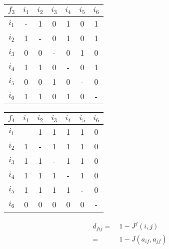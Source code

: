 \begin{table}[p]
\begin{center}
    \begin{tabular}{ | c | c | c | c | c | c | c | } 
    \hline
     $f_3$ & $i_1$ & $i_2$ & $i_3$ & $i_4$ & $i_5$ & $i_6$  \\ \hline
     $i_1$ & -  &  1  &  0  &  1  &  0  &  1 \\ \hline
     $i_2$ & 1  &  -  &  0  &  1  &  0  &  1  \\ \hline
     $i_3$ & 0  &  0  &  -  &  0  &  1  &  0 \\ \hline
     $i_4$ & 1  &  1  &  0  &  -  &  0  &  1 \\ \hline
     $i_5$ & 0  &  0  &  1  &  0  &  -  &  0 \\ \hline
     $i_6$ & 1  &  1  &  0  &  1  &  0  &  - \\ \hline
    \end{tabular}    
    \quad
    \begin{tabular}{ | c | c | c | c | c | c | c | } 
    \hline
     $f_4$ & $i_1$ & $i_2$ & $i_3$ & $i_4$ & $i_5$ & $i_6$  \\ \hline
     $i_1$ & -  &  1  &  1 &   1 &   1  &  0 \\ \hline
     $i_2$ & 1  &  -  &  1 &   1 &   1  &  0  \\ \hline
     $i_3$ & 1  &  1  &  - &   1 &   1  &  0 \\ \hline
     $i_4$ & 1  &  1  &  1 &   - &   1  &  0 \\ \hline
     $i_5$ & 1  &  1  &  1 &   1 &   -  &  0 \\ \hline
     $i_6$ & 0  &  0  &  0 &   0 &   0  &  - \\ \hline
    \end{tabular}        
\end{center}
\end{table}


\begin{equation}
\label{eq:dfij_jaccard}
\begin{split}
d_{fij} =&~ 1-J^f(i,j) \\
    =&~ 1-J(a_{if},a_{jf})
\end{split} 
\end{equation}

